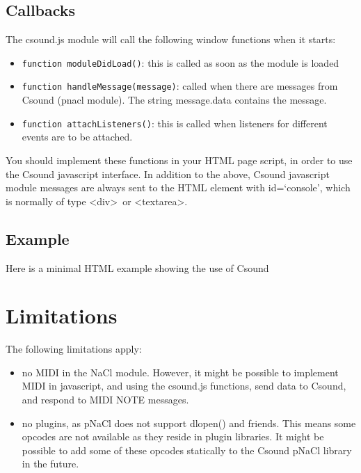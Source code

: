 \documentclass[11pt]{article}
\begin{document}
\subsection{Callbacks}

The csound.js module will call the following window functions when it starts:

\begin{itemize} 
\item {\tt function moduleDidLoad()}: this is called as soon as the module is loaded 
\item {\tt function handleMessage(message)}: called when there are messages from Csound (pnacl module). 
The string message.data contains the message.
\item {\tt function attachListeners()}: this is called when listeners for different events are to be attached. 
\end{itemize}

You should implement these functions in your HTML page script, in order to use the Csound javascript interface.
In addition to the above, Csound javascript module messages are always sent to the HTML element with id=`console', 
which is normally of type \textless div\textgreater \, or \textless textarea\textgreater .

\subsection{Example}

Here is a minimal HTML example showing the use of Csound



\section{Limitations}

The following limitations apply:

\begin{itemize}
\item no MIDI in the NaCl module. However, it might be possible to implement MIDI in javascript, and using the csound.js functions,
send data to Csound, and respond to MIDI NOTE messages.
\item no plugins, as pNaCl does not support dlopen() and friends. This means some opcodes are not available as they reside in plugin libraries.
It might be possible to add some of these opcodes statically to the Csound pNaCl library in the future.
\end {itemize}
\end{document}
